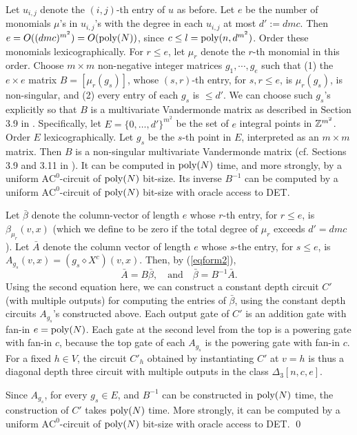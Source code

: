\documentclass[11pt]{article}
\begin{document}
Let $u_{i,j}$ denote the $(i,j)$-th entry of  $u$ as before.
Let $e$ be the  number of monomials $\mu$'s in $u_{i,j}$'s with the  degree in each $u_{i,j}$ at most $d':=d m c$.
Then $e=O(( d m c)^{m^2})=O({\mbox {poly}}(N))$, since $c \le l={\mbox {poly}}(n,d^{m^2})$.
Order these monomials lexicographically. 
For $r\le e$, let $\mu_r$ denote the $r$-th monomial in this order. 
Choose $m\times m$ non-negative integer  matrices $g_1,\cdots,g_e$ such that 
(1) the $e\times e$ matrix $B=[\mu_r(g_s)]$, whose $(s,r)$-th entry, for  $s,r \le e$, is
 $\mu_r(g_s)$,   is non-singular, and 
(2) every entry of each $g_s$ is $\le d'$. We can choose such $g_s$'s explicitly so that $B$ is a 
multivariate Vandermonde matrix as described in  Section 3.9 in \cite{pan}. Specifically, 
let $E=\{0,\ldots,d'\}^{m^2}$ be the set of $e$ integral points in $\mathbb{Z}^{m^2}$.
Order $E$  lexicographically. 
Let $g_s$ be the $s$-th point in $E$, interpreted as an $m \times m$ matrix.
Then $B$ is a non-singular multivariate Vandermonde matrix 
(cf. Sections 3.9 and 3.11 in \cite{pan}). It can be computed in ${\mbox {poly}}(N)$ time, and
more strongly, by a uniform $\mbox{AC}^0$-circuit of ${\mbox {poly}}(N)$ bit-size.
Its inverse $B^{-1}$ can  be computed by a uniform $\mbox{AC}^0$-circuit of 
${\mbox {poly}}(N)$ bit-size with oracle access to DET.

Let $\bar \beta$ denote the column-vector of length  $e$ whose $r$-th entry, for $r\le e$,
is $\beta_{\mu_r}(v, x)$ (which we define to be zero if the total degree of $\mu_r$ exceeds $d'=d m c $). 
Let $\bar  A$ denote the column vector of length $e$  whose $s$-the entry, for $s\le e$, is 
$A_{g_s}(v, x)=(g_s \diamond  X^c)(v,x)$.
Then, by (\ref{eqform2}),
\[ \bar  A= B \bar \beta, \quad \mbox{and} \quad \bar \beta = B^{-1} \bar  A.\]
Using the second  equation here,
we can construct a constant depth circuit $C'$ (with multiple outputs) 
for computing the entries of $\bar \beta$, using the constant depth circuits $A_{g_s}$'s constructed 
above. 
Each output  gate of $C'$ is an addition gate with fan-in $e={\mbox {poly}}(N)$. 
Each gate at the second level from the top is a  powering gate with fan-in $c$, 
because the top gate of each  $A_{g_s}$ is the powering  gate with fan-in $c$. 
For a fixed $h \in V$, the circuit $C'_h$  obtained by instantiating $C'$ at $v=h$ 
is thus a  diagonal depth three circuit with multiple outputs in the class $\Delta_3[n,c,e]$.  


Since $A_{g_s}$, for every $g_s \in E$, and $B^{-1}$ can be constructed in ${\mbox {poly}}(N)$ time,
the construction of $C'$ takes ${\mbox {poly}}(N)$ time. 
More strongly, it can be computed by a uniform $\mbox{AC}^0$-circuit of   ${\mbox {poly}}(N)$ bit-size with oracle access to DET. \qed
\end{document}
